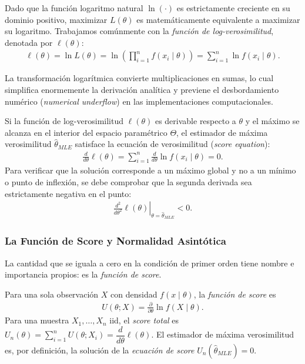 Dado que la función logaritmo natural $\ln(\cdot)$ es estrictamente creciente en su dominio positivo, maximizar $L(\theta)$ es matemáticamente equivalente a maximizar su logaritmo. Trabajamos comúnmente con la \emph{función de log-verosimilitud}, denotada por $\ell(\theta)$:
\begin{align}
	\ell(\theta) = \ln L(\theta) = \ln \left( \prod_{i=1}^n f(x_i \mid \theta) \right) = \sum_{i=1}^n \ln f(x_i \mid \theta).
	\label{eq:log_verosimilitud}
\end{align}

La transformación logarítmica convierte multiplicaciones en sumas, lo cual simplifica enormemente la derivación analítica y previene el desbordamiento numérico (\emph{numerical underflow}) en las implementaciones computacionales.

\begin{teorema}
	Si la función de log-verosimilitud $\ell(\theta)$ es derivable respecto a $\theta$ y el máximo se alcanza en el interior del espacio paramétrico $\Theta$, el estimador de máxima verosimilitud $\hat{\theta}_{MLE}$ satisface la ecuación de verosimilitud (\emph{score equation}):
	\begin{align}
		\frac{d}{d\theta} \ell(\theta) = \sum_{i=1}^n \frac{d}{d\theta} \ln f(x_i \mid \theta) = 0.
		\label{eq:mle_score}
	\end{align}
	Para verificar que la solución corresponde a un máximo global y no a un mínimo o punto de inflexión, se debe comprobar que la segunda derivada sea estrictamente negativa en el punto:
	\begin{align}
		\left. \frac{d^2}{d\theta^2} \ell(\theta) \right|_{\theta = \hat{\theta}_{MLE}} < 0.
	\end{align}
\end{teorema}

\subsubsection{La Función de Score y Normalidad Asintótica}

La cantidad que se iguala a cero en la condición de primer orden tiene nombre e importancia propios: es la \emph{función de score}.

\begin{definicion}
	Para una sola observación $X$ con densidad $f(x\mid\theta)$, la \emph{función de score} es
	\begin{align}
		U(\theta; X) = \frac{\partial}{\partial\theta}\ln f(X\mid\theta).
	\end{align}
	Para una muestra $X_1,\ldots,X_n$ iid, el \emph{score total} es $U_n(\theta) = \sum_{i=1}^n U(\theta; X_i) = \dfrac{d}{d\theta}\ell(\theta)$. El estimador de máxima verosimilitud es, por definición, la solución de la \emph{ecuación de score} $U_n(\hat\theta_{MLE}) = 0$.
\end{definicion}

